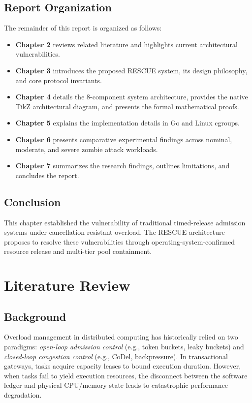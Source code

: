 \documentclass[12pt,a4paper]{report}
\begin{document}
\section{Report Organization}
The remainder of this report is organized as follows:
\begin{itemize}
    \item \textbf{Chapter 2} reviews related literature and highlights current architectural vulnerabilities.
    \item \textbf{Chapter 3} introduces the proposed RESCUE system, its design philosophy, and core protocol invariants.
    \item \textbf{Chapter 4} details the 8-component system architecture, provides the native TikZ architectural diagram, and presents the formal mathematical proofs.
    \item \textbf{Chapter 5} explains the implementation details in Go and Linux cgroups.
    \item \textbf{Chapter 6} presents comparative experimental findings across nominal, moderate, and severe zombie attack workloads.
    \item \textbf{Chapter 7} summarizes the research findings, outlines limitations, and concludes the report.
\end{itemize}

\section{Conclusion}
This chapter established the vulnerability of traditional timed-release admission systems under cancellation-resistant overload. The RESCUE architecture proposes to resolve these vulnerabilities through operating-system-confirmed resource release and multi-tier pool containment.

\chapter{Literature Review}

\section{Background}
Overload management in distributed computing has historically relied on two paradigms: \textit{open-loop admission control} (e.g., token buckets, leaky buckets) and \textit{closed-loop congestion control} (e.g., CoDel, backpressure). In transactional gateways, tasks acquire capacity leases to bound execution duration. However, when tasks fail to yield execution resources, the disconnect between the software ledger and physical CPU/memory state leads to catastrophic performance degradation.
\end{document}

